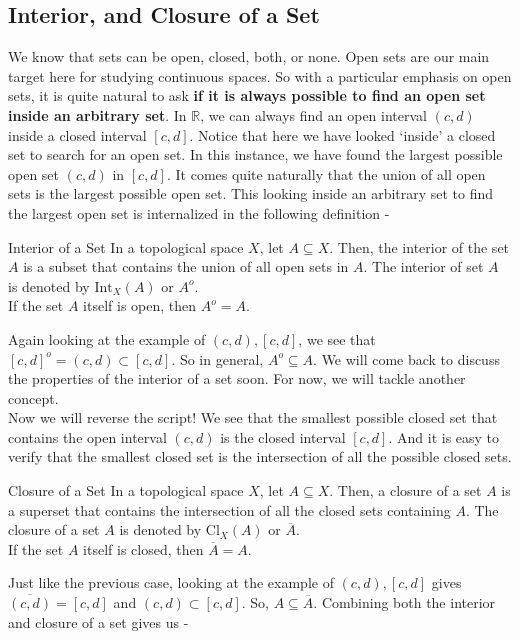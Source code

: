 \subsection{Interior, and Closure of a Set}
We know that sets can be open, closed, both, or none. Open sets are our main target here for studying continuous spaces. So with a particular emphasis on open sets, it is quite natural to ask \textbf{if it is always possible to find an open set inside an arbitrary set}. In $\mathbb{R}$, we can always find an open interval $(c,d)$ inside a closed interval $[c,d]$. Notice that here we have looked `inside' a closed set to search for an open set. In this instance, we have found the largest possible open set $(c,d)$ in $[c,d]$. It comes quite naturally that the union of all open sets is the largest possible open set. This looking inside an arbitrary set to find the largest open set is internalized in the following definition -
\begin{Definition}{Interior of a Set}\label{interior_set}
    In a topological space $X$, let $A\subseteq X$. Then, the interior of the set $A$ is a subset that contains the union of all open sets in $A$. The interior of set $A$ is denoted by $\mathrm{Int}_X(A)$ or $A^o$.\\
    If the set $A$ itself is open, then $A^o=A$.
\end{Definition}
\noindent Again looking at the example of $(c,d),[c,d]$, we see that $[c,d]^o=(c,d)\subset[c,d]$. So in general, $\boxed{A^o\subseteq A}$. We will come back to discuss the properties of the interior of a set soon. For now, we will tackle another concept.\\
Now we will reverse the script! We see that the smallest possible closed set that contains the open interval $(c,d)$ is the closed interval $[c,d]$. And it is easy to verify that the smallest closed set is the intersection of all the possible closed sets.
\begin{Definition}{Closure of a Set}\label{closure_set}
    In a topological space $X$, let $A\subseteq X$. Then, a closure of a set $A$ is a superset that contains the intersection of all the closed sets containing $A$. The closure of a set $A$ is denoted by $\mathrm{Cl}_X(A)$ or $\overline{A}$.\\
    If the set $A$ itself is closed, then $\overline{A}=A$.
\end{Definition}
\noindent Just like the previous case, looking at the example of $(c,d),[c,d]$ gives $\overline{(c,d)}=[c,d]$ and $(c,d)\subset[c,d]$. So, $\boxed{A\subseteq\overline{A}}$. Combining both the interior and closure of a set gives us -

